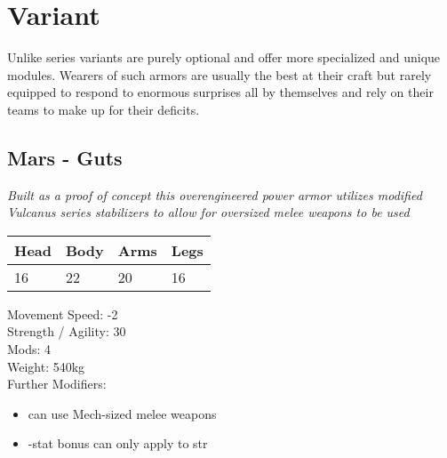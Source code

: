 \documentclass[12pt,a4paper,openany]{book}
\begin{document}
	\section{Variant}
	Unlike series variants are purely optional and offer more specialized and unique modules. Wearers of such armors are usually the best at their craft but rarely equipped to respond to enormous surprises all by themselves and rely on their teams to make up for their deficits.
	\begin{multicols}{2}
	\subsection{Mars - Guts}
	\textit{Built as a proof of concept this overengineered power armor utilizes modified Vulcanus series stabilizers to allow for oversized melee weapons to be used}\par
	\begin{tabular}{|l|l|l|l|}
		\hline
		Head & Body & Arms & Legs\\
		\hline
		16 & 22 & 20 & 16\\
		\hline
	\end{tabular}
	\par
	Movement Speed: -2\\
	Strength / Agility: 30\\
	Mods: 4\\
	Weight: 540kg\\
	Further Modifiers:
	\vspace{-8mm}
	\begin{itemize}
		\setlength\itemsep{-8mm}
		\item can use Mech-sized melee weapons
		\item -stat bonus can only apply to str
	\end{itemize}
	\par

\end{multicols}
\end{document}
